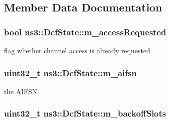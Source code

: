 \subsection{Member Data Documentation}
\subsubsection[{\texorpdfstring{m\+\_\+access\+Requested}{m_accessRequested}}]{\setlength{\rightskip}{0pt plus 5cm}bool ns3\+::\+Dcf\+State\+::m\+\_\+access\+Requested\hspace{0.3cm}{\ttfamily [protected]}}\hypertarget{classns3_1_1DcfState_a1c3852e4b2e6bd880626598065c4eba2}{}\label{classns3_1_1DcfState_a1c3852e4b2e6bd880626598065c4eba2}


flag whether channel access is already requested 

\subsubsection[{\texorpdfstring{m\+\_\+aifsn}{m_aifsn}}]{\setlength{\rightskip}{0pt plus 5cm}uint32\+\_\+t ns3\+::\+Dcf\+State\+::m\+\_\+aifsn\hspace{0.3cm}{\ttfamily [protected]}}\hypertarget{classns3_1_1DcfState_aaf738fa407b0467722d15ca70713213d}{}\label{classns3_1_1DcfState_aaf738fa407b0467722d15ca70713213d}


the A\+I\+F\+SN 

\subsubsection[{\texorpdfstring{m\+\_\+backoff\+Slots}{m_backoffSlots}}]{\setlength{\rightskip}{0pt plus 5cm}uint32\+\_\+t ns3\+::\+Dcf\+State\+::m\+\_\+backoff\+Slots\hspace{0.3cm}{\ttfamily [protected]}}\hypertarget{classns3_1_1DcfState_aac983a544558935c606b6099e88aeb7f}{}\label{classns3_1_1DcfState_aac983a544558935c606b6099e88aeb7f}


